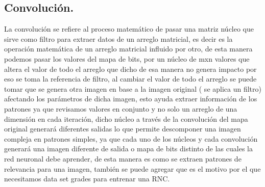 \documentclass[a4paper, 12pt]{article}
\begin{document}
    \subsection{Convolución.}
    La convolución se refiere al proceso matemático de pasar una matriz núcleo que sirve como filtro para extraer datos de un arreglo matricial, es decir es la operación matemática de un arreglo matricial influido por otro, de esta manera podemos pasar los valores del mapa de bits, por un núcleo de mxn valores que altera el valor de todo el arreglo que dicho de esa manera no genera impacto por eso se toma la referencia de filtro, al cambiar el valor de todo el arreglo se puede tomar que se genera otra imagen en base a la imagen original ( se aplica un filtro) afectando los parámetros de dicha imagen, esto ayuda extraer información de los patrones ya que revisamos valores en conjunto y no solo un arreglo de una dimensión en cada iteración, dicho núcleo a través de la convolución del mapa original generará diferentes salidas lo que permite descomponer una imagen compleja en patrones simples, ya que cada uno de los núcleos y cada convolución generará una imagen diferente de salida o mapa de bits distinto de las cuales la red neuronal debe aprender, de esta manera es como se extraen patrones de relevancia para una imagen, también se puede agregar que es el motivo por el que necesitamos data set grades para entrenar una RNC. 
\end{document}
